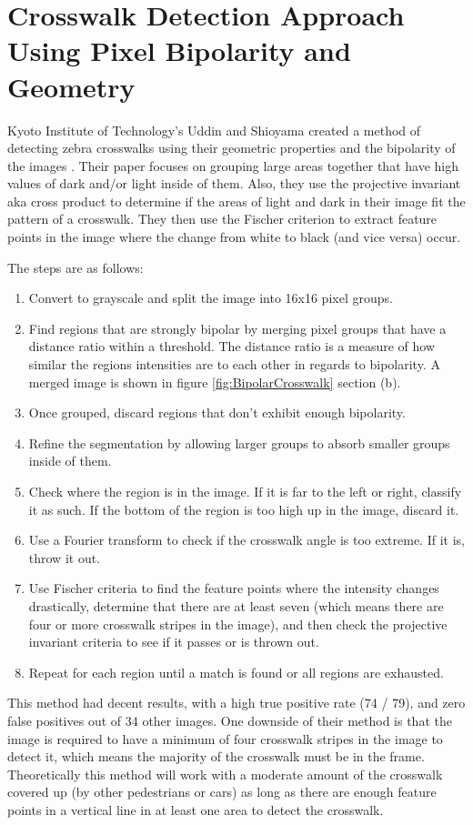 \documentclass[12pt]{ucthesis}
\begin{document}

\section{Crosswalk Detection Approach Using Pixel Bipolarity and Geometry}

Kyoto Institute of Technology's Uddin and Shioyama created a method of detecting zebra crosswalks using their geometric properties and the bipolarity of the images \cite{relatedworkbipolarity}. Their paper focuses on grouping large areas together that have high values of dark and/or light inside of them. Also, they use the projective invariant aka cross product to determine if the areas of light and dark in their image fit the pattern of a crosswalk. They then use the Fischer criterion to extract feature points in the image where the change from white to black (and vice versa) occur.

The steps are as follows:
\begin{enumerate}
   \item Convert to grayscale and split the image into 16x16 pixel groups.
   \item Find regions that are strongly bipolar by merging pixel groups that have a distance ratio within a threshold. The distance ratio is a measure of how similar the regions intensities are to each other in regards to bipolarity. A merged image is shown in figure \ref{fig:BipolarCrosswalk} section  (b).
   \item Once grouped, discard regions that don't exhibit enough bipolarity.
   \item Refine the segmentation by allowing larger groups to absorb smaller groups inside of them.
   \item Check where the region is in the image. If it is far to the left or right, classify it as such. If the bottom of the region is too high up in the image, discard it.
   \item Use a Fourier transform to check if the crosswalk angle is too extreme. If it is, throw it out. 
   \item Use Fischer criteria to find the feature points where the intensity changes drastically, determine that there are at least seven (which means there are four or more crosswalk stripes in the image), and then check the projective invariant criteria to see if it passes or is thrown out\cite{relatedworkbipolarity}. 
   \item Repeat for each region until a match is found or all regions are exhausted.
\end{enumerate}
This method had decent results, with a high true positive rate (74 / 79), and zero false positives out of 34 other images. One downside of their method is that the image is required to have a minimum of four crosswalk stripes in the image to detect it, which means the majority of the crosswalk must be in the frame. Theoretically this method will work with a moderate amount of the crosswalk covered up (by other pedestrians or cars) as long as there are enough feature points in a vertical line in at least one area to detect the crosswalk. 
\end{document}
